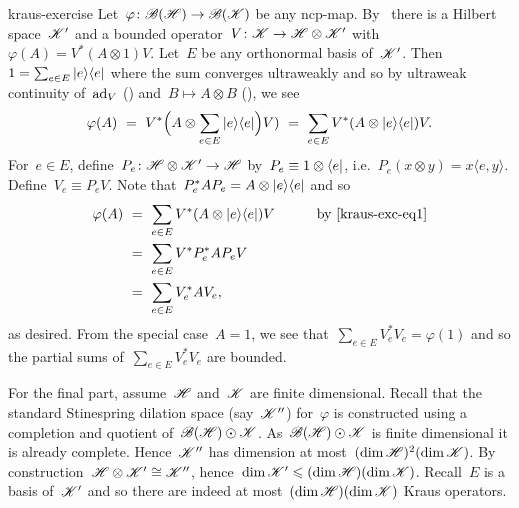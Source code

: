 \begin{solution}{kraus-exercise}%
Let~$\varphi\colon \mathscr{B}(\mathscr{H}) \to \mathscr{B}(\mathscr{K})$
    be any ncp-map.
By~
    there is a Hilbert space~$\mathscr{K}'$
    and a bounded operator~$V\colon \mathscr{K} \to \mathscr{H} \otimes \mathscr{K}'$
    with~$\varphi(A) = V^* (A \otimes 1) V$.
Let~$E$ be any orthonormal basis of~$\mathscr{K}'$.
    Then~$1 = \sum_{e\in E} \left|e\right>\!\left<e\right|$
        where the sum converges ultraweakly
        and so by ultraweak continuity of~$\mathrm{ad}_V$ ()
        and~$B \mapsto A\otimes B$ (), we see
    \begin{equation}\label{kraus-exc-eq1}
        \varphi(A) \ =\  V^* \Bigl(A \otimes \sum_{e\in E} \left|e\right>\!\left<e\right|\Bigr) V
        ) \ =\  \sum_{e \in E} V^* (A \otimes \left|e\right>\!\left<e\right|) V.
    \end{equation}
For~$e\in E$, define~$P_e \colon \mathscr{H} \otimes \mathscr{K}' \to \mathscr{H}$
    by~$P_e \equiv 1\otimes \bra{e}$,
    i.e.~$P_e(x \otimes y) = x \langle e, y\rangle$.
Define~$V_e \equiv P_e V$.
    Note that~$P_e^*AP_e = A \otimes\left|e\right>\!\left<e\right|$ and so
\begin{alignat*}{2}
    \varphi(A)
    &\ = \  \sum_{e \in E} V^* (A \otimes \left|e\right>\!\left<e\right| ) V &\qquad&
    \text{by \eqref{kraus-exc-eq1}} \\
    &\ = \  \sum_{e \in E} V^* P_e^*A P_e V \\
    &\ = \  \sum_{e \in E} V_e^* A V_e,
\end{alignat*}
as desired.
From the special case~$A=1$, we see
    that~$\sum_{e \in E} V_e^*V_e = \varphi(1)$
    and so the partial sums of~$\sum_{e \in E} V_e^* V_e$ are bounded.

For the final part, assume~$\mathscr{H}$ and~$\mathscr{K}$ are finite dimensional.
Recall that the standard Stinespring dilation space (say~$\mathscr{K}''$)
    for~$\varphi$ is constructed using a completion
    and quotient of~$\mathscr{B}(\mathscr{H})\odot \mathscr{K}$.
As~$\mathscr{B}(\mathscr{H})\odot \mathscr{K}$ is finite dimensional
    it is already complete.
    Hence~$\mathscr{K}''$ has dimension at most~$(\dim\mathscr{H})^2( \dim\mathscr{K})$.
By construction~$\mathscr{H} \otimes \mathscr{K}' \cong \mathscr{K}''$,
    hence~$\dim \mathscr{K}' \leqslant (\dim \mathscr{H} )(\dim \mathscr{K})$.
Recall~$E$ is a basis of~$\mathscr{K}'$
    and so there are indeed at most~$(\dim \mathscr{H} )(\dim \mathscr{K})$
        Kraus operators.
\end{solution}
